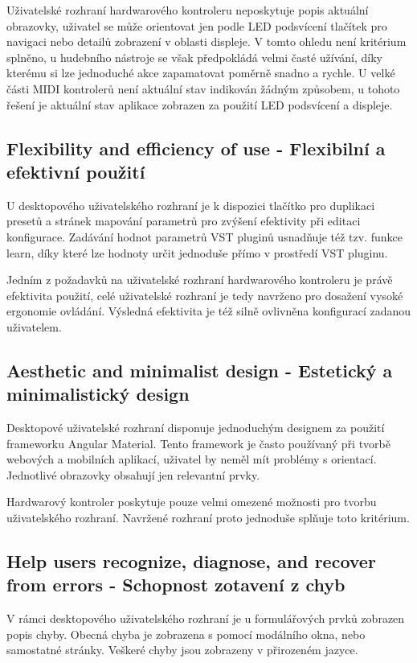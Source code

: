 \documentclass[thesis=M,czech]{FITthesis}[2019/03/06]
\begin{document}
			Uživatelské rozhraní hardwarového kontroleru neposkytuje popis aktuální obrazovky, uživatel se může orientovat jen podle LED podsvícení tlačítek pro navigaci nebo detailů zobrazení v oblasti displeje. V tomto ohledu není kritérium splněno, u hudebního nástroje se však předpokládá velmi časté užívání, díky kterému si lze jednoduché akce zapamatovat poměrně snadno a rychle. U velké části MIDI kontrolerů není aktuální stav indikován žádným způsobem, u tohoto řešení je aktuální stav aplikace zobrazen za použití LED podsvícení a displeje.
			
		\subsection{Flexibility and efficiency of use - Flexibilní a efektivní použití}
			U desktopového uživatelského rozhraní je k dispozici tlačítko pro duplikaci presetů a stránek mapování parametrů pro zvýšení efektivity při editaci konfigurace. Zadávání hodnot parametrů VST pluginů usnadňuje též tzv. funkce learn, díky které lze hodnoty určit jednoduše přímo v prostředí VST pluginu.
			
			Jedním z požadavků na uživatelské rozhraní hardwarového kontroleru je právě efektivita použití, celé uživatelské rozhraní je tedy navrženo pro dosažení vysoké ergonomie ovládání. Výsledná efektivita je též silně ovlivněna konfigurací zadanou uživatelem.
		
		\subsection{Aesthetic and minimalist design - Estetický a minimalistický design}
			Desktopové uživatelské rozhraní disponuje jednoduchým designem za použití frameworku Angular Material. Tento framework je často používaný při tvorbě webových a mobilních aplikací, uživatel by neměl mít problémy s orientací. Jednotlivé obrazovky obsahují jen relevantní prvky.
			
			Hardwarový kontroler poskytuje pouze velmi omezené možnosti pro tvorbu uživatelského rozhraní. Navržené rozhraní proto jednoduše splňuje toto kritérium. 
		
		\subsection{Help users recognize, diagnose, and recover from errors - Schopnost zotavení z chyb}
			V rámci desktopového uživatelského rozhraní je u formulářových prvků zobrazen popis chyby. Obecná chyba je zobrazena s pomocí modálního okna, nebo samostatné stránky. Veškeré chyby jsou zobrazeny v přirozeném jazyce.
			
\end{document}
